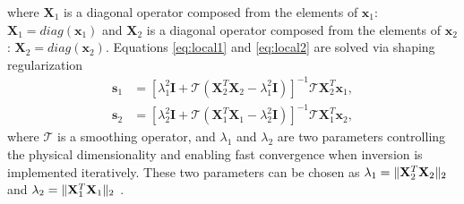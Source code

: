 where $\mathbf{X}_1$ is a diagonal operator composed from the elements of $\mathbf{x}_1$: $\mathbf{X}_1=diag(\mathbf{x}_1)$ and $\mathbf{X}_2$ is a diagonal operator composed from the elements of $\mathbf{x}_2$: $\mathbf{X}_2=diag(\mathbf{x}_2)$.
Equations \ref{eq:local1} and \ref{eq:local2} are solved via shaping regularization
\begin{align}
\label{eq:local3}
\mathbf{s}_1 &= [\lambda_1^2\mathbf{I} + \mathcal{T}(\mathbf{X}_2^T\mathbf{X}_2-\lambda_1^2\mathbf{I})]^{-1}\mathcal{T}\mathbf{X}_2^T\mathbf{x}_1,\\
\label{eq:local4}
\mathbf{s}_2 &= [\lambda_2^2\mathbf{I} + \mathcal{T}(\mathbf{X}_1^T\mathbf{X}_1-\lambda_2^2\mathbf{I})]^{-1}\mathcal{T}\mathbf{X}_1^T\mathbf{x}_2,
\end{align}
where $\mathbf{\mathcal{T}}$ is a smoothing operator, and $\lambda_1$ and $\lambda_2$ are two parameters controlling the physical dimensionality and enabling fast convergence when inversion is implemented iteratively. These two parameters can be chosen as $\lambda_1  = \Arrowvert\mathbf{X}_2^T\mathbf{X}_2\Arrowvert_2$ and $\lambda_2  = \Arrowvert\mathbf{X}_1^T\mathbf{X}_1\Arrowvert_2$ \cite[]{fomel2007localattr}.



